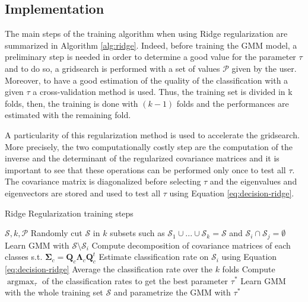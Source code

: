 \documentclass[a4paper,11pt,DIV=16]{scrartcl}
\begin{document}
    \subsection{Implementation}

    The main steps of the training algorithm when using Ridge regularization are summarized in Algorithm \ref{alg:ridge}. Indeed, before training the GMM model, a preliminary step is needed in order to determine a good value for the parameter $\tau$ and to do so, a gridsearch is performed with a set of values $\mathcal{P}$ given by the user. Moreover, to have a good estimation of the quality of the classification with a given $\tau$ a cross-validation method is used. Thus, the training set is divided in k folds, then, the training is done with $(k-1)$ folds and the performances are estimated with the remaining fold.

    A particularity of this regularization method is used to accelerate the gridsearch. More precisely, the two computationally costly step are the computation of the inverse and the determinant of the regularized covariance matrices and it is important to see that these operations can be performed only once to test all $\tau$. The covariance matrix is diagonalized before selecting $\tau$ and the eigenvalues and eigenvectors are stored and used to test all $\tau$ using Equation \ref{eq:decision-ridge}.

    \begin{algorithm}
    \caption{Ridge Regularization training steps\label{alg:ridge}}
    \begin{algorithmic}[1]
    \REQUIRE $\mathcal{S},k,\mathcal{P}$
    \STATE Randomly cut $\mathcal{S}$ in $k$ subsets such as $\mathcal{S}_1 \cup \text{...} \cup \mathcal{S}_k = \mathcal{S}$ and $\mathcal{S}_i \cap \mathcal{S}_j = \emptyset$
    \STATE Learn GMM with $\mathcal{S} \setminus \mathcal{S}_i$
    \STATE Compute decomposition of covariance matrices of each classes s.t. $\boldsymbol{\Sigma}_c = \mathbf{Q}_c \boldsymbol{\Lambda}_c \mathbf{Q}_c^t$
    \STATE Estimate classification rate on $\mathcal{S}_i$ using Equation \ref{eq:decision-ridge}
    \ENDFOR
    \ENDFOR
    \STATE Average the classification rate over the $k$ folds
    \STATE Compute $\text{arg} \max_{\tau}$ of the classification rates to get the best parameter $\tau^*$
    \STATE Learn GMM with the whole training set $\mathcal{S}$ and parametrize the GMM with $\tau^*$
    \end{algorithmic}
    \end{algorithm}
\end{document}
